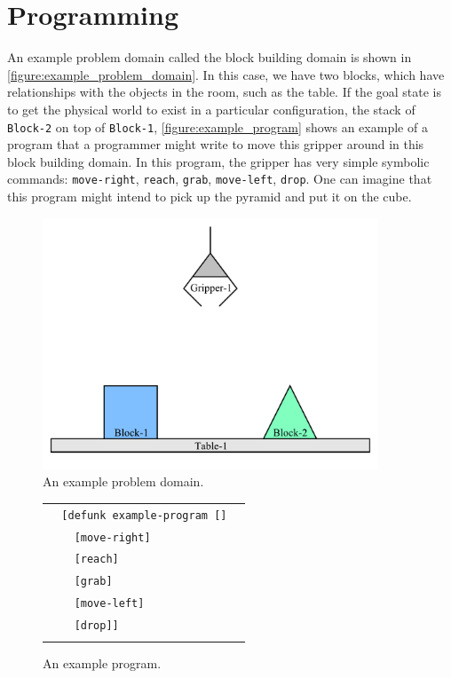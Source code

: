 \section{Programming}

An example problem domain called the block building domain is shown in
{\mbox{\autoref{figure:example_problem_domain}}}.  In this case, we
have two blocks, which have relationships with the objects in the
room, such as the table.  If the goal state is to get the physical
world to exist in a particular configuration, the stack of {\tt
  Block-2} on top of {\tt Block-1},
{\mbox{\autoref{figure:example_program}}} shows an example of a
program that a programmer might write to move this gripper around in
this block building domain.  In this program, the gripper has very
simple symbolic commands: {\tt move-right}, {\tt reach}, {\tt grab},
{\tt move-left}, {\tt drop}.  One can imagine that this program might
intend to pick up the pyramid and put it on the cube.
\begin{figure}
\center
\includegraphics[width=10cm]{gfx/blocks_world_example-1}
\caption{An example problem domain.}
\label{figure:example_problem_domain}
\end{figure}
\begin{figure}
\center
\begin{tabular}{l}
\\
  {\tt ~~[defunk example-program []}~~ \\
  {\tt ~~~~[move-right]} ~~\\
  {\tt ~~~~[reach]} ~~\\
  {\tt ~~~~[grab]} ~~\\
  {\tt ~~~~[move-left]} ~~\\
  {\tt ~~~~[drop]]} ~~\\
\\
\end{tabular}
\caption{An example program.}
\label{figure:example_program}
\end{figure}

